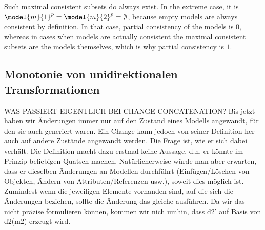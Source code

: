 \begin{definition}[Partial Consistency]
\end{definition}

Such maximal consistent subsets do always exist.
In the extreme case, it is $\model{m}{1}^p = \model{m}{2}^p = \emptyset$, because empty models are always consistent by definition.
In that case, partial consistency of the models is $0$, whereas in cases when models are actually consistent the maximal consistent subsets are the models themselves, which is why partial consistency is $1$.

\subsection{Monotonie von unidirektionalen Transformationen}
WAS PASSIERT EIGENTLICH BEI CHANGE CONCATENATION?
Bis jetzt haben wir Änderungen immer nur auf den Zustand eines Modells angewandt, für den sie auch generiert waren. Ein Change kann jedoch von seiner Definition her auch auf andere Zustände angewandt werden. Die Frage ist, wie er sich dabei verhält. Die Definition macht dazu erstmal keine Aussage, d.h. er könnte im Prinzip beliebigen Quatsch machen. Natürlicherweise würde man aber erwarten, dass er dieselben Änderungen an Modellen durchführt (Einfügen/Löschen von Objekten, Ändern von Attributen/Referenzen usw.), soweit dies möglich ist. Zumindest wenn die jeweiligen Elemente vorhanden sind, auf die sich die Änderungen beziehen, sollte die Änderung das gleiche ausführen.
Da wir das nicht präzise formulieren können, kommen wir nich umhin, dass d2' auf Basis von d2(m2) erzeugt wird.

